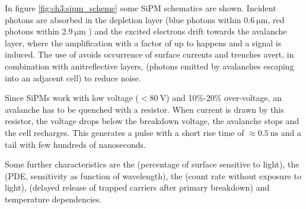 In figure \ref{fig:ch3:sipm_scheme} some SiPM schematics are shown. Incident photons are absorbed in the depletion layer (blue photons within $\SI{0.6}{\micro\meter}$, red photons within $\SI{2.9}{\micro\meter}$ \cite{wermes}) and the excited electrons drift towards the avalanche layer, where the amplification with a factor of up to  happens and a signal is induced. The use of  avoids occurrence of surface currents and trenches avert, in combination with anitreflective layers,  (photons emitted by avalanches escaping into an adjacent cell) to reduce noise. \par 
Since SiPMs work with low voltage ($<\SI{80}{\volt}$) and 10\%-20\% over-voltage, an avalanche has to be quenched with a resistor. When current is drawn by this resistor, the voltage drops below the breakdown voltage, the avalanche stops and the cell recharges. This generates a pulse with a short rise time of $\approx\SI{0.5}{\nano\second}$ and a tail with few hundreds of nanoseconds. \par 
Some further characteristics are the  (percentage of surface sensitive to light), the  (PDE, sensitivity as function of wavelength), the  (count rate without exposure to light),  (delayed release of trapped carriers after primary breakdown) and temperature dependencies.




